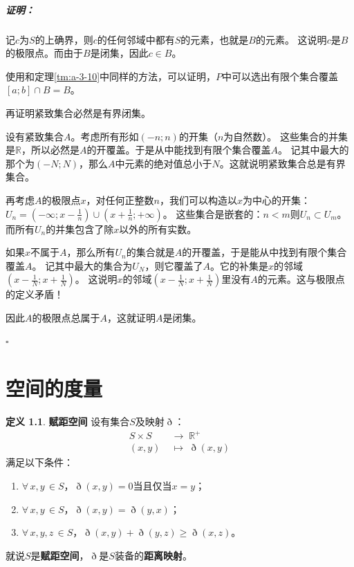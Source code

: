 \documentclass[12pt,UTF8]{ctexbook}
\theoremstyle{definition}
\newtheorem{df}{定义}[section]
\theoremstyle{plain}
\renewenvironment{proof}{\paragraph{\textbf{证明：}}}{\hfill$\square$}
\begin{document}
\begin{appendix}
\begin{proof}
    记$c$为$S$的上确界，则$c$的任何邻域中都有$S$的元素，也就是$B$的元素。
    这说明$c$是$B$的极限点。而由于$B$是闭集，因此$c\in B$。

    使用和定理\ref{tm:a-3-10}中同样的方法，可以证明，$P$中可以选出有限个集合覆盖$[a;b]\cap B = B$。

    再证明紧致集合必然是有界闭集。

    设有紧致集合$A$。考虑所有形如$(-n;n)$的开集（$n$为自然数）。
    这些集合的并集是$\mathbb{R}$，所以必然是$A$的开覆盖。于是从中能找到有限个集合覆盖$A$。
    记其中最大的那个为$(-N;N)$，那么$A$中元素的绝对值总小于$N$。这就说明紧致集合总是有界集合。

    再考虑$A$的极限点$x$，对任何正整数$n$，我们可以构造以$x$为中心的开集：$\displaystyle U_n = \left(-\infty;x-\frac{1}{n}\right)\cup\left(x+\frac{1}{n};+\infty\right)$。
    这些集合是嵌套的：$n<m$则$U_n\subset U_m$。而所有$U_n$的并集包含了除$x$以外的所有实数。

    如果$x$不属于$A$，那么所有$U_n$的集合就是$A$的开覆盖，于是能从中找到有限个集合覆盖$A$。
    记其中最大的集合为$U_N$，则它覆盖了$A$。它的补集是$x$的邻域$\displaystyle\left(x-\frac{1}{N};x+\frac{1}{N}\right)$。
    这说明$x$的邻域$\displaystyle\left(x-\frac{1}{N};x+\frac{1}{N}\right)$里没有$A$的元素。这与极限点的定义矛盾！
    
    因此$A$的极限点总属于$A$，这就证明$A$是闭集。

\end{proof}

\chapter{空间的度量}

\begin{df}{\textbf{赋距空间}}
    设有集合$S$及映射$\eth$：
    \begin{align*}
        S\times S \;&\rightarrow \; \mathbb{R}^+ \\
        (x, y) \;&\mapsto \; \eth(x, y)
    \end{align*}
    满足以下条件：
    \begin{enumerate}
        \item $\forall \, x, y\, \in S$，$\eth(x, y) = 0$当且仅当$x = y$；
        \item $\forall \, x, y\, \in S$，$\eth(x, y) = \eth(y, x)$；
        \item $\forall \, x, y, z\, \in S$，$\eth(x, y) + \eth(y, z) \geqslant \eth (x, z)$。
    \end{enumerate}
    就说$S$是\textbf{赋距空间}，$\eth$是$S$装备的\textbf{距离映射}。
\end{df}


\end{appendix}
\end{document}
